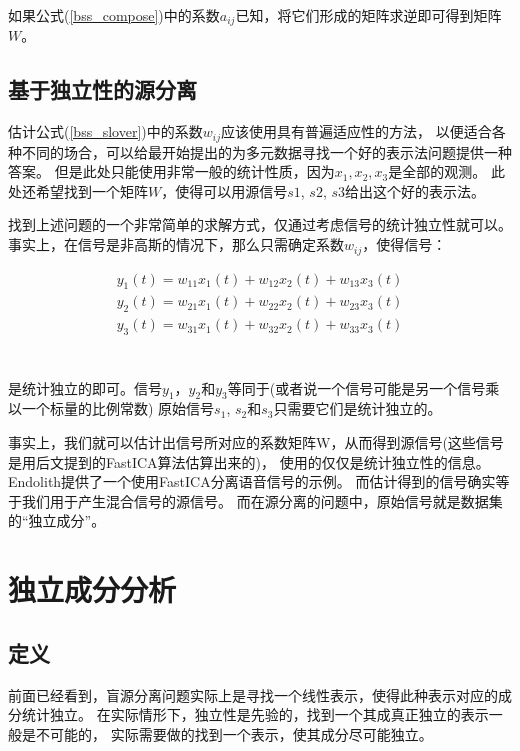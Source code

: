 如果公式(\ref{bss_compose})中的系数$a_{ij}$已知，将它们形成的矩阵求逆即可得到矩阵$W$。

\subsection{基于独立性的源分离}
估计公式(\ref{bss_slover})中的系数$w_{ij}$应该使用具有普遍适应性的方法，
以便适合各种不同的场合，可以给最开始提出的为多元数据寻找一个好的表示法问题提供一种答案。
但是此处只能使用非常一般的统计性质，因为$x_1, x_2, x_3$是全部的观测。
此处还希望找到一个矩阵$W$，使得可以用源信号$s1$, $s2$, $s3$给出这个好的表示法。

找到上述问题的一个非常简单的求解方式，仅通过考虑信号的统计独立性就可以。
事实上，在信号是非高斯的情况下，那么只需确定系数$w_{ij}$，使得信号：\\
\parbox{10cm}{
\begin{eqnarray*}
y_1(t)=w_{11}x_1(t)+w_{12}x_2(t)+w_{13}x_3(t) \\
y_2(t)=w_{21}x_1(t)+w_{22}x_2(t)+w_{23}x_3(t) \\
y_3(t)=w_{31}x_1(t)+w_{32}x_2(t)+w_{33}x_3(t) \\
\end{eqnarray*}
}\hfill
\parbox{3cm}{\begin{eqnarray}\label{bss_slover} \end{eqnarray}}

是统计独立的即可。信号$y_1$，$y_2$和$y_3$等同于(或者说一个信号可能是另一个信号乘以一个标量的比例常数)
原始信号$s_1$, $s_2$和$s_3$只需要它们是统计独立的。

事实上，我们就可以估计出信号所对应的系数矩阵W，从而得到源信号(这些信号是用后文提到的FastICA算法估算出来的)，
使用的仅仅是统计独立性的信息。
Endolith提供了一个使用FastICA分离语音信号的示例。
而估计得到的信号确实等于我们用于产生混合信号的源信号。
而在源分离的问题中，原始信号就是数据集的“独立成分”。


\section{独立成分分析}
\subsection{定义}
前面已经看到，盲源分离问题实际上是寻找一个线性表示，使得此种表示对应的成分统计独立。
在实际情形下，独立性是先验的，找到一个其成真正独立的表示一般是不可能的，
实际需要做的找到一个表示，使其成分尽可能独立。

